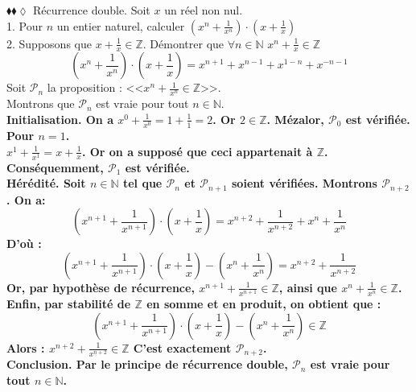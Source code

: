 \documentclass[11pt]{article}
\begin{document}
\begin{exercice}{$\blacklozenge\blacklozenge\lozenge$ Récurrence double.}{}
    Soit $x$ un réel non nul.\\
    1. Pour $n$ un entier naturel, calculer $(x^n+\frac{1}{x^n})\cdot(x+\frac{1}{x})$\\
    2. Supposons que $x+\frac{1}{x}\in\mathbb{Z}$. Démontrer que $\forall n\in\mathbb{N}$ $x^n + \frac{1}{x}\in\mathbb{Z}$
    \tcblower
    \begin{equation*}
        (x^n + \frac{1}{x^n})\cdot(x+\frac{1}{x}) = x^{n+1}+x^{n-1}+x^{1-n}+x^{-n-1}
    \end{equation*}
     Soit $\mathcal{P}_n$ la proposition : <<$x^n+\frac{1}{x^n}\in\mathbb{Z}$>>.\\
    Montrons que $\mathcal{P}_n$ est vraie pour tout $n\in\mathbb{N}$.\\
    \bf{Initialisation.} On a $x^0 + \frac{1}{x^0} = 1 + \frac{1}{1} = 2$. Or $2\in\mathbb{Z}$. Mézalor, $\mathcal{P}_0$ est vérifiée.\\
    Pour $n=1$.\\
    $x^1 + \frac{1}{x^1} = x + \frac{1}{x}$. Or on a supposé que ceci appartenait à $\mathbb{Z}$. Conséquemment, $\mathcal{P}_1$ est vérifiée.\\[0.5cm]
    \bf{Hérédité.} Soit $n\in\mathbb{N}$ tel que $\mathcal{P}_n$ et $\mathcal{P}_{n+1}$ soient vérifiées. Montrons $\mathcal{P}_{n+2}$. On a:
    \begin{equation*}
        (x^{n+1}+\frac{1}{x^{n+1}})\cdot(x+\frac{1}{x})=x^{n+2}+\frac{1}{x^{n+2}}+x^n+\frac{1}{x^{n}}
    \end{equation*}
    D'où :
    \begin{equation*}
        (x^{n+1}+\frac{1}{x^{n+1}})\cdot(x+\frac{1}{x})-(x^n+\frac{1}{x^n}) = x^{n+2}+\frac{1}{x^{n+2}}
    \end{equation*}
    Or, par hypothèse de récurrence, $x^{n+1}+\frac{1}{x^{n+1}}\in\mathbb{Z}$, ainsi que $x^n+\frac{1}{x^n}\in\mathbb{Z}$.\\
    Enfin, par stabilité de $\mathbb{Z}$ en somme et en produit, on obtient que :
    \begin{equation*}
        (x^{n+1}+\frac{1}{x^{n+1}})\cdot(x+\frac{1}{x})-(x^n+\frac{1}{x^n})\in\mathbb{Z}
    \end{equation*}
    Alors : $x^{n+2} + \frac{1}{x^{n+2}} \in \mathbb{Z}$
    C'est exactement $\mathcal{P}_{n+2}$.\\
    \bf{Conclusion.} Par le principe de récurrence double, $\mathcal{P}_n$ est vraie pour tout $n\in\mathbb{N}$.
\end{exercice}
\end{document}
